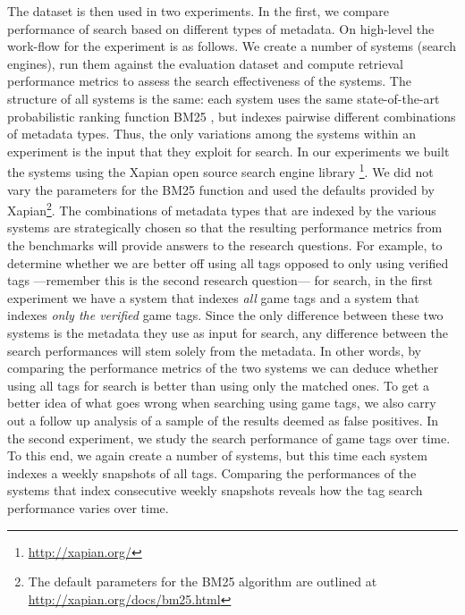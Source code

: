 The dataset is then used in two experiments. In the first, we compare performance of search based on different types of metadata. On high-level the work-flow for the experiment is as follows. We create a number of systems (search engines), run them against the evaluation dataset and compute retrieval performance metrics to assess the search effectiveness of the systems. The structure of all systems is the same: each system uses the same state-of-the-art probabilistic ranking function BM25 \cite{bm25}, but indexes pairwise different combinations of metadata types. Thus, the only variations among the systems within an experiment is the input that they exploit for search. In our experiments we built the systems using the Xapian open source search engine library \footnote{\url{http://xapian.org/}}. We did not vary the parameters for the BM25 function and used the defaults provided by Xapian\footnote{The default parameters for the BM25 algorithm are outlined at \url{http://xapian.org/docs/bm25.html}}. The combinations of metadata types that are indexed by the various systems are strategically chosen so that the resulting performance metrics from the benchmarks will provide answers to the research questions. For example, to determine whether we are better off using all tags opposed to only using verified tags ---remember this is the second research question--- for search, in the first experiment we have a system that indexes \textit{all} game tags and a system that indexes \textit{only the verified} game tags. Since the only difference between these two systems is the metadata they use as input for search, any difference between the search performances will stem solely from the metadata. In other words, by comparing the performance metrics of the two systems we can deduce whether using all tags for search is better than using only the matched ones. To get a better idea of what goes wrong when searching using game tags, we also carry out a follow up analysis of a sample of the results deemed as false positives.
In the second experiment, we study the search performance of game tags over time. To this end, we again create a number of systems, but this time each system indexes a weekly snapshots of all tags. Comparing the performances of the systems that index consecutive weekly snapshots reveals how the tag search performance varies over time.

